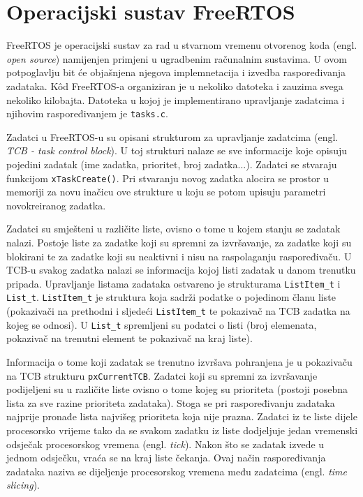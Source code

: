 \documentclass[../zavrsni.tex]{subfiles}
\begin{document}
\sloppy

\justifying

\section{Operacijski sustav FreeRTOS}

FreeRTOS je operacijski sustav za rad u stvarnom vremenu otvorenog koda (engl. \textit{open source}) namijenjen primjeni u ugradbenim 
računalnim sustavima. U ovom potpoglavlju bit će objašnjena 
njegova implemnetacija i izvedba raspoređivanja zadataka. K\^{o}d FreeRTOS-a organiziran je u nekoliko datoteka i zauzima 
svega nekoliko kilobajta. Datoteka u kojoj je implementirano upravljanje zadatcima i njihovim raspoređivanjem je \texttt{tasks.c}.

Zadatci u FreeRTOS-u su opisani strukturom za upravljanje zadatcima (engl. \textit{TCB - task control block}). U toj strukturi nalaze
se sve informacije koje opisuju pojedini zadatak (ime zadatka, prioritet, broj zadatka...).  
Zadatci se stvaraju funkcijom \texttt{xTaskCreate()}.
Pri stvaranju novog zadatka alocira se prostor u memoriji za novu inačicu 
ove strukture u koju se potom upisuju parametri novokreiranog zadatka.

Zadatci su smješteni u različite liste, ovisno o tome u kojem stanju se zadatak nalazi. Postoje liste za zadatke koji su
spremni za izvršavanje, za zadatke koji su blokirani te za zadatke koji su neaktivni i nisu na raspolaganju raspoređivaču.
U TCB-u svakog zadatka nalazi se informacija kojoj listi zadatak u danom trenutku pripada. Upravljanje listama zadataka ostvareno je strukturama
\texttt{ListItem\_t} i \texttt{List\_t}. \texttt{ListItem\_t} je struktura koja sadrži podatke o pojedinom članu liste (pokazivači na prethodni i 
sljedeći \texttt{ListItem\_t} te 
pokazivač na TCB zadatka na kojeg se odnosi). U \texttt{List\_t} spremljeni su podatci o listi (broj elemenata, pokazivač na trenutni element te
pokazivač na kraj liste).

Informacija o tome koji zadatak se trenutno izvršava pohranjena je u pokazivaču na TCB strukturu \texttt{pxCurrentTCB}.
Zadatci koji su spremni za izvršavanje podijeljeni su u različite liste ovisno o tome kojeg su prioriteta (postoji posebna lista
 za sve razine prioriteta zadataka).
Stoga se pri raspoređivanju zadataka najprije pronađe lista najvišeg prioriteta koja nije prazna. Zadatci iz te liste dijele 
procesorsko vrijeme tako da se svakom zadatku iz liste dodjeljuje jedan vremenski odsječak procesorskog vremena (engl. \textit{tick}).
Nakon što se zadatak izvede u jednom odsječku, vraća se na kraj liste čekanja. Ovaj način raspoređivanja zadataka naziva se dijeljenje
procesorskog vremena među zadatcima (engl. \textit{time slicing}).
\end{document}
